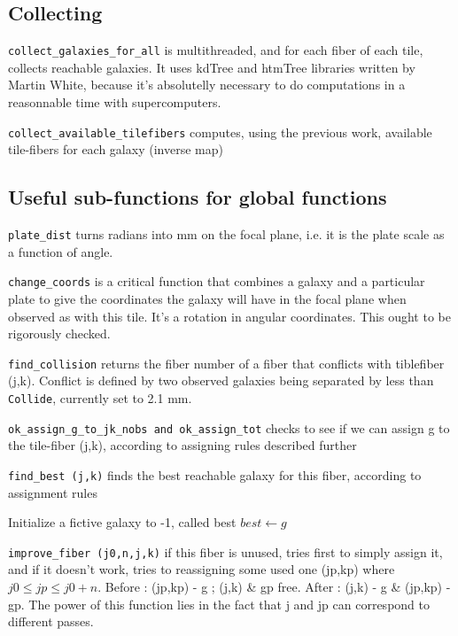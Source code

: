 \documentclass{article}
\begin{document}
\subsection{Collecting}
{\tt collect\_galaxies\_for\_all} is multithreaded, and for each fiber of each tile, collects reachable galaxies. It uses kdTree and htmTree libraries written by Martin White, because it's absolutelly necessary to do computations in a reasonnable time with supercomputers.

{\tt collect\_available\_tilefibers} computes, using the previous work, available tile-fibers for each galaxy (inverse map)

\subsection{Useful sub-functions for global functions}
{\tt plate\_dist} turns radians into mm on the focal plane, i.e. it is the plate scale as a function of angle.

{\tt change\_coords} is a critical function that combines a galaxy and a particular plate to give the coordinates the galaxy will have in the focal plane when observed as with this tile. It's a rotation in angular coordinates. This ought to be rigorously checked.

{\tt find\_collision} returns the fiber number of a fiber that conflicts with tiblefiber (j,k).  Conflict is defined by two observed galaxies being separated by less than {\tt Collide}, currently set to 2.1 mm.

{\tt ok\_assign\_g\_to\_jk\_nobs and ok\_assign\_tot} checks to see if we can assign g to the tile-fiber (j,k), according to assigning rules described further

{\tt find\_best (j,k)} finds the best reachable galaxy for this fiber, according to assignment rules

\begin{algorithm}
	\caption{Find best(j,k)}\label{euclid}
	\begin{algorithmic}[1]
		\State Initialize a fictive galaxy to -1, called best
		\State $best \gets g$
		\EndIf
		\EndFor
	\end{algorithmic}
\end{algorithm}

{\tt improve\_fiber (j0,n,j,k)} if this fiber is unused, tries first to simply assign it, and if it doesn't work, tries to reassigning some used one (jp,kp) where $j0\le jp \le j0+n$. Before : (jp,kp) - g ; (j,k) \& gp free. After : (j,k) - g \& (jp,kp) - gp. The power of this function lies in the fact that j and jp can correspond to different passes.
\end{document}

